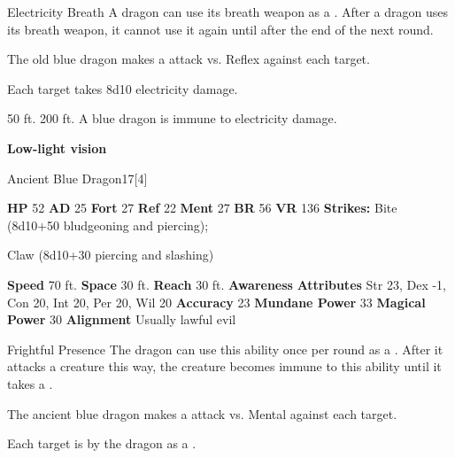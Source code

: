     \begin{freeability}{Electricity Breath}
      A dragon can use its breath weapon as a .
      After a dragon uses its breath weapon, it cannot use it again until after the end of the next round.
      \par The old blue dragon makes a  attack
        vs. Reflex against each target.
    
    \hit Each target takes 8d10 electricity damage.
    \end{freeability}
  
      
       50 ft.
     200 ft.
     A blue dragon is immune to electricity damage.
    \par\noindent\textbf{Low-light vision}
  

  \begin{monsubsection}{Ancient Blue Dragon}{17}[4]
    \vspace{-1em}\vspace{-1em}
    \vspace{0em}

    
    

    \begin{spellcontent}
      \begin{spelltargetinginfo}
        \pari \textbf{HP} 52 \monsep
          \textbf{AD} 25 \monsep
          \textbf{Fort} 27 \monsep
          \textbf{Ref} 22 \monsep
          \textbf{Ment} 27
        \pari \textbf{BR} 56 \monsep
        \textbf{VR} 136
        \pari \textbf{Strikes:}
            Bite  (8d10+50 bludgeoning and piercing);
\par Claw  (8d10+30 piercing and slashing)
      \end{spelltargetinginfo}
    \end{spellcontent}
    \begin{monsterfooter}
      \pari \textbf{Speed} 70 ft. \monsep
        \textbf{Space} 30 ft. \monsep
        \textbf{Reach} 30 ft.
      \pari \textbf{Awareness} 
      \pari \textbf{Attributes}
        Str 23, Dex -1,
        Con 20, Int 20,
        Per 20, Wil 20
      \pari \textbf{Accuracy} 23 \monsep
        \textbf{Mundane Power} 33 \monsep
      \textbf{Magical Power} 30
      \pari \textbf{Alignment} Usually lawful evil
    \end{monsterfooter}
  \end{monsubsection}
  \begin{freeability}{Frightful Presence}
      The dragon can use this ability once per round as a .
      After it attacks a creature this way, the creature becomes immune to this ability until it takes a .
      \par The ancient blue dragon makes a  attack
        vs. Mental against each target.
    
    \hit Each target is  by the dragon as a .
    \end{freeability}
  

